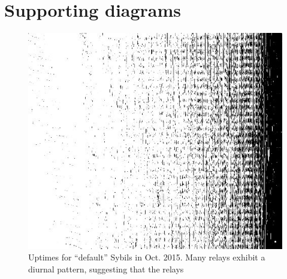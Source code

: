 \appendix

\section{Supporting diagrams}

\begin{figure}[t]
	\centering
	\includegraphics[width=\linewidth]{diagrams/default-sybils-2015-10.jpg}
	\caption{Uptimes for ``default'' Sybils in Oct. 2015.  Many relays exhibit a
	diurnal pattern, suggesting that the relays }
	\label{fig:default-sybils-uptime}
\end{figure}
